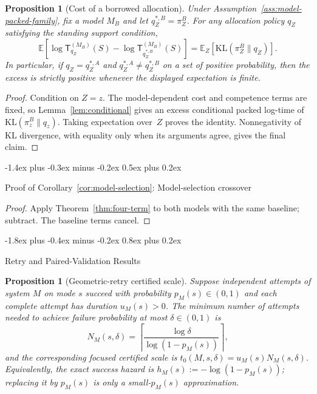 \documentclass[10pt,twocolumn]{article}
\makeatletter
\theoremstyle{paperplain}
\newtheorem{proposition}[theorem]{Proposition}
\theoremstyle{paperdefinition}
\theoremstyle{paperremark}
\renewcommand{\section}{%
  \@startsection{section}{1}{\z@}%
    {-1.8ex plus -0.4ex minus -0.2ex}%
    {0.8ex plus 0.2ex}%
    {\normalfont\large\bfseries\raggedright}}
\renewcommand{\subsection}{%
  \@startsection{subsection}{2}{\z@}%
    {-1.4ex plus -0.3ex minus -0.2ex}%
    {0.5ex plus 0.2ex}%
    {\normalfont\normalsize\bfseries\raggedright}}
\newcommand{\KL}{\mathrm{KL}}
\newcommand{\E}{\mathbb{E}}
\makeatother
\begin{document}
\begin{proposition}[Cost of a borrowed allocation]
\label{prop:borrowed-allocation}
Under Assumption~\ref{ass:model-packed-family}, fix a model $M_B$ and let
$q_Z^{*,B}=\pi_Z^B$.  For any allocation policy $q_Z$ satisfying the standing
support condition,
\[
\E\!\left[
\log\mathsf T_{q_Z}^{(M_B)}(S)
-\log\mathsf T_{q_Z^{*,B}}^{(M_B)}(S)
\right]
=\E_Z\!\left[\KL(\pi_Z^B\|q_Z)\right].
\]
In particular, if $q_Z=q_Z^{*,A}$ and
$q_Z^{*,A}\ne q_Z^{*,B}$ on a set of positive probability, then the excess is
strictly positive whenever the displayed expectation is finite.
\end{proposition}

\begin{proof}
Condition on $Z=z$.  The model-dependent cost and competence terms are fixed,
so Lemma~\ref{lem:conditional} gives an excess conditional packed log-time of
$\KL(\pi_z^B\|q_z)$.  Taking expectation over~$Z$ proves the identity.
Nonnegativity of KL divergence, with equality only when its arguments agree,
gives the final claim.
\end{proof}

\subsection{Proof of Corollary~\ref{cor:model-selection}: Model-selection crossover}
\label{app:proof:cor:model-selection}

\begin{proof}
Apply Theorem~\ref{thm:four-term} to both models with the same baseline; subtract.
The baseline terms cancel.
\end{proof}

\clearpage
\section{Retry and Paired-Validation Results}
\label{app:retry-and-validation}

\begin{proposition}[Geometric-retry certified scale]
\label{prop:geometric-certified-scale}
Suppose independent attempts of system $M$ on mode $s$ succeed with probability $p_M(s)\in(0,1)$ and each complete attempt has duration $u_M(s)>0$.
The minimum number of attempts needed to achieve failure probability at most $\delta\in(0,1)$ is
\[
N_M(s,\delta)
=
\left\lceil\frac{\log\delta}{\log(1-p_M(s))}\right\rceil,
\]
and the corresponding focused certified scale is $t_0(M,s,\delta)=u_M(s)N_M(s,\delta)$.
Equivalently, the exact success hazard is $h_M(s):=-\log(1-p_M(s))$; replacing it by $p_M(s)$ is only a small-$p_M(s)$ approximation.
\end{proposition}
\end{document}
